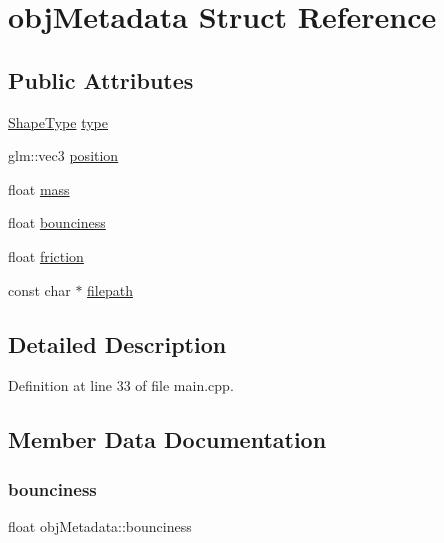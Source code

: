 \hypertarget{structobj_metadata}{}\section{obj\+Metadata Struct Reference}
\label{structobj_metadata}
\subsection*{Public Attributes}
\begin{DoxyCompactItemize}
\item 
\hyperlink{main_8cpp_a5a4538eeab397888d88a4eefcc5a1345}{Shape\+Type} \hyperlink{structobj_metadata_af6153058d69f26848a28eeae724d8f05}{type}
\item 
glm\+::vec3 \hyperlink{structobj_metadata_aa08b002e6a99770d0c68e03ab25088ff}{position}
\item 
float \hyperlink{structobj_metadata_ac2df1bad1e332a30af67e57a55a93930}{mass}
\item 
float \hyperlink{structobj_metadata_ad38eef7c4699d2a74423f2e0d8ef8559}{bounciness}
\item 
float \hyperlink{structobj_metadata_a672e831325e522dd8fe5eecbab6a6f94}{friction}
\item 
const char $\ast$ \hyperlink{structobj_metadata_a7e922e759ce7c08f2f70c47034b1880a}{filepath}
\end{DoxyCompactItemize}


\subsection{Detailed Description}


Definition at line 33 of file main.\+cpp.



\subsection{Member Data Documentation}
\mbox{\label{structobj_metadata_ad38eef7c4699d2a74423f2e0d8ef8559}} 
\subsubsection{\texorpdfstring{bounciness}{bounciness}}
{\footnotesize\ttfamily float obj\+Metadata\+::bounciness}



